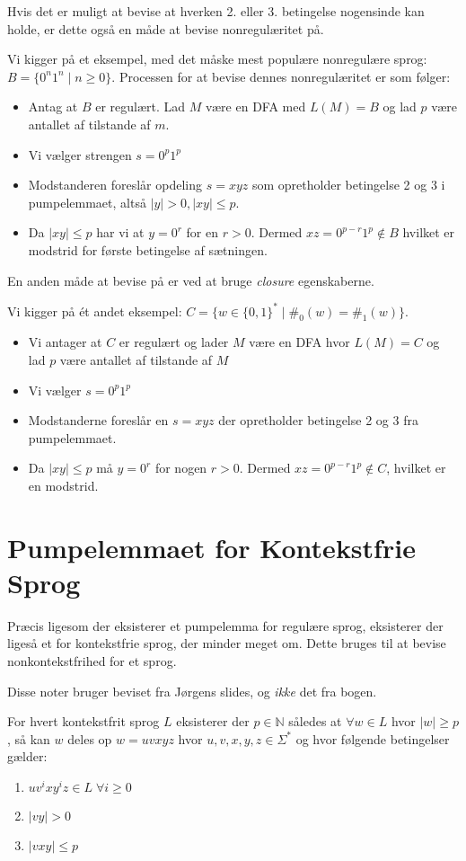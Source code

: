 Hvis det er muligt at bevise at hverken 2. eller 3. betingelse nogensinde kan holde, er dette også en måde at bevise nonregulæritet på.

Vi kigger på et eksempel, med det måske mest populære nonregulære sprog: $B = \{0^{n}1^{n} \mid n \ge 0\}$. Processen for at bevise dennes nonregulæritet er som følger:
\begin{itemize}
	\item Antag at $B$ er regulært. Lad $M$ være en DFA med $L(M) = B$ og lad $p$ være antallet af tilstande af $m$.
	\item Vi vælger strengen $s = 0^{p}1^{p}$
	\item Modstanderen foreslår opdeling $s = xyz$ som opretholder betingelse 2 og 3 i pumpelemmaet, altså $|y| > 0, |xy| \le p$.
	\item Da $|xy| \le p$ har vi at $y = 0^{r}$ for en $r > 0$. Dermed $xz = 0^{p-r}1^{p} \notin B$ hvilket er modstrid for første betingelse af sætningen.
\end{itemize}

En anden måde at bevise på er ved at bruge \textit{closure} egenskaberne.

Vi kigger på ét andet eksempel: $C = \{w \in \{0,1\}^{*} \mid \#_{0}(w) = \#_{1}(w)\}$.
\begin{itemize}
	\item Vi antager at $C$ er regulært og lader $M$ være en DFA hvor $L(M) = C$ og lad $p $ være antallet af tilstande af $M$
	\item Vi vælger $s = 0^{p}1^{p}$
	\item Modstanderne foreslår en $s = xyz$ der opretholder betingelse 2 og 3 fra pumpelemmaet.
	\item Da $|xy| \le p$ må $y = 0^{r}$ for nogen $r > 0$. Dermed $xz = 0^{p-r}1^{p} \notin C$, hvilket er en modstrid.
\end{itemize}

\section{Pumpelemmaet for Kontekstfrie Sprog}%
\label{sec:label}

Præcis ligesom der eksisterer et pumpelemma for regulære sprog, eksisterer der ligeså et for kontekstfrie sprog, der minder meget om. Dette bruges til at bevise nonkontekstfrihed for et sprog.

Disse noter bruger beviset fra Jørgens slides, og \textit{ikke} det fra bogen.

\begin{theorem}[Pumpelemmaet]
	For hvert kontekstfrit sprog $L$ eksisterer der $p \in \mathbb{N}$ således at \(\forall w \in L\) hvor $|w| \ge p$, så kan $w$ deles op $w = uvxyz$ hvor $u,v,x,y,z \in \Sigma^{*}$ og hvor følgende betingelser gælder:
	\begin{enumerate}
		\item $uv^{i}xy^{i}z \in L \; \forall i \ge 0$
		\item $|vy| > 0$
		\item $|vxy| \le p$
	\end{enumerate}
\end{theorem}

